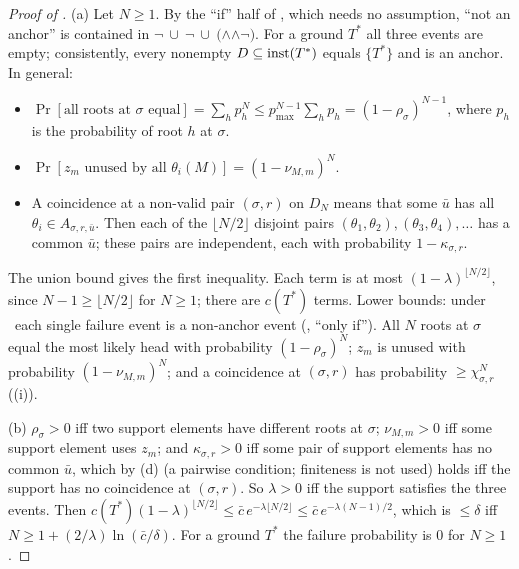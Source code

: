 \begin{proof}[Proof of ]
(a) Let $N\ge1$. By the ``if'' half of , which needs no assumption, ``not an anchor'' is contained in $\neg$\evRs$\ \cup\ \neg$\evN$\ \cup\ ($\evRs$\wedge$\evN$\wedge\neg$\evU$)$. For a ground $T^*$ all three events are empty; consistently, every nonempty $D\subseteq\mathrm{inst}(T^*)$ equals $\{T^*\}$ and is an anchor. In general:
\begin{itemize}
\item $\Pr[\text{all roots at }\sigma\text{ equal}]=\sum_hp_h^N\le p_{\max}^{N-1}\sum_hp_h=(1-\rho_\sigma)^{N-1}$, where $p_h$ is the probability of root $h$ at $\sigma$.
\item $\Pr[z_m\text{ unused by all }\theta_i(M)]=(1-\nu_{M,m})^N$.
\item A coincidence at a non-valid pair $(\sigma,r)$ on $D_N$ means that some $\bar u$ has all $\theta_i\in A_{\sigma,r,\bar u}$. Then each of the $\lfloor N/2\rfloor$ disjoint pairs $(\theta_1,\theta_2),(\theta_3,\theta_4),\dots$ has a common $\bar u$; these pairs are independent, each with probability $1-\kappa_{\sigma,r}$.
\end{itemize}
The union bound gives the first inequality. Each term is at most $(1-\lambda)^{\lfloor N/2\rfloor}$, since $N-1\ge\lfloor N/2\rfloor$ for $N\ge1$; there are $c(T^*)$ terms. Lower bounds: under \Rich\ each single failure event is a non-anchor event (, ``only if''). All $N$ roots at $\sigma$ equal the most likely head with probability $(1-\rho_\sigma)^N$; $z_m$ is unused with probability $(1-\nu_{M,m})^N$; and a coincidence at $(\sigma,r)$ has probability $\ge\chi_{\sigma,r}^N$ ((i)).

(b) $\rho_\sigma>0$ iff two support elements have different roots at $\sigma$; $\nu_{M,m}>0$ iff some support element uses $z_m$; and $\kappa_{\sigma,r}>0$ iff some pair of support elements has no common $\bar u$, which by (d) (a pairwise condition; finiteness is not used) holds iff the support has no coincidence at $(\sigma,r)$. So $\lambda>0$ iff the support satisfies the three events. Then $c(T^*)(1-\lambda)^{\lfloor N/2\rfloor}\le\bar c\,e^{-\lambda\lfloor N/2\rfloor}\le\bar c\,e^{-\lambda(N-1)/2}$, which is $\le\delta$ iff $N\ge1+(2/\lambda)\ln(\bar c/\delta)$. For a ground $T^*$ the failure probability is $0$ for $N\ge1$.


\end{proof}
